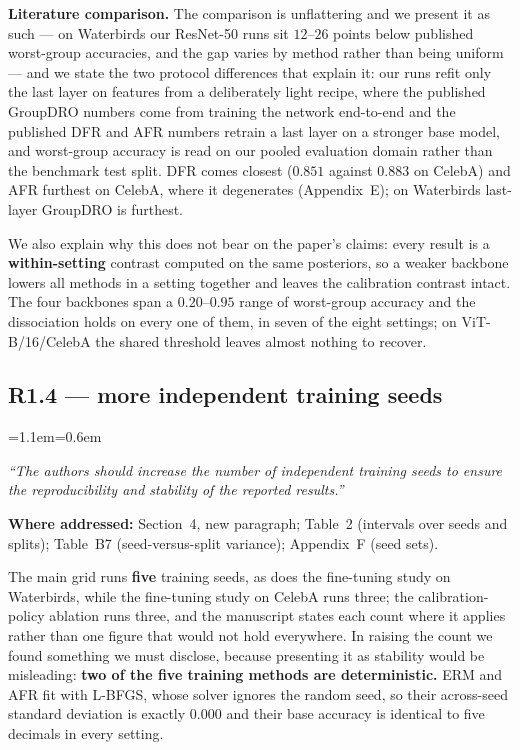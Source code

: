 \documentclass[11pt,a4paper]{article}
\newenvironment{reviewer}
  {\begin{list}{}{\leftmargin=1.1em\rightmargin=0.6em}\item[]\itshape\color{revgrey}\small}
  {\end{list}}
\newcommand{\where}[1]{{\textbf{Where addressed:} #1\par}}
\newcommand{\rpoint}[2]{\subsection*{#1 --- #2}}
\begin{document}
\textbf{Literature comparison.} The comparison is unflattering and we present it as such --- on Waterbirds our ResNet-50 runs sit $12$--$26$ points below published worst-group
accuracies, and the gap varies by method rather than being uniform --- and
we state the two protocol differences that explain it: our runs refit only the last layer on
features from a deliberately light recipe, where the published GroupDRO numbers come from training
the network end-to-end and the published DFR and AFR numbers retrain a last layer on a stronger
base model, and worst-group
accuracy is read on our pooled evaluation domain rather than the benchmark test split. DFR comes
closest ($0.851$ against $0.883$ on CelebA) and AFR furthest on CelebA, where it degenerates (Appendix~E); on
Waterbirds last-layer GroupDRO is furthest.

We also explain why this does not bear on the paper's claims: every result is a
\textbf{within-setting} contrast computed on the same posteriors, so a weaker backbone lowers all methods in a setting together and leaves the calibration contrast intact. The four backbones span a
$0.20$--$0.95$ range of worst-group accuracy and the dissociation holds on every one of them, in seven of the
eight settings; on ViT-B/16/CelebA the shared threshold leaves almost nothing to recover.

\rpoint{R1.4}{more independent training seeds}

\begin{reviewer}
``The authors should increase the number of independent training seeds to ensure the reproducibility
and stability of the reported results.''
\end{reviewer}

\where{Section~4, new paragraph; Table~2 (intervals over seeds and splits); Table~B7 (seed-versus-split variance); Appendix~F (seed sets).}

The main grid runs \textbf{five} training seeds, as does the fine-tuning study on Waterbirds,
while the fine-tuning study on CelebA runs three; the
calibration-policy ablation runs three, and the manuscript states each count where it applies
rather than one figure that would not hold everywhere. In raising the count we found something we must disclose, because presenting it as
stability would be misleading: \textbf{two of the five training methods are deterministic.} ERM and AFR fit with
L-BFGS, whose solver ignores the random seed, so their across-seed standard deviation is exactly
$0.000$ and their base accuracy is identical to five decimals in every setting.
\end{document}
